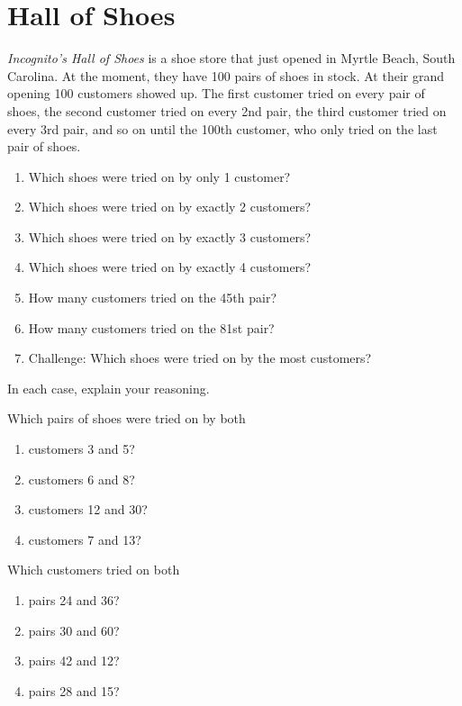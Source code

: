 \newpage
\section{Hall of Shoes}\label{A:Hall}
  
\begin{prob}  
\textit{Incognito's Hall of Shoes} is a shoe store that just
  opened in Myrtle Beach, South Carolina. At the moment, they have 100
  pairs of shoes in stock. At their grand opening 100 customers showed
  up. The first customer tried on every pair of shoes, the second
  customer tried on every 2nd pair, the third customer tried on every
  3rd pair, and so on until the 100th customer, who only tried on the
  last pair of shoes.
\begin{enumerate}
\item Which shoes were tried on by only 1 customer?
\item Which shoes were tried on by exactly 2 customers?
\item Which shoes were tried on by exactly 3 customers?
\item Which shoes were tried on by exactly 4 customers?
\item How many customers tried on the 45th pair?  
\item How many customers tried on the 81st pair?  
\item Challenge:  Which shoes were tried on by the most customers?  
\end{enumerate}
In each case, explain your reasoning.
\end{prob}

\begin{prob}
Which pairs of shoes were tried on by both 
\begin{enumerate}
\item customers 3 and 5?
\item customers 6 and 8?
\item customers 12 and 30?
\item customers 7 and 13?
\end{enumerate}
\end{prob}

\begin{prob}
Which customers tried on both 
\begin{enumerate}
\item pairs 24 and 36?
\item pairs 30 and 60?
\item pairs 42 and 12?
\item pairs 28 and 15?
\end{enumerate}
\end{prob}


